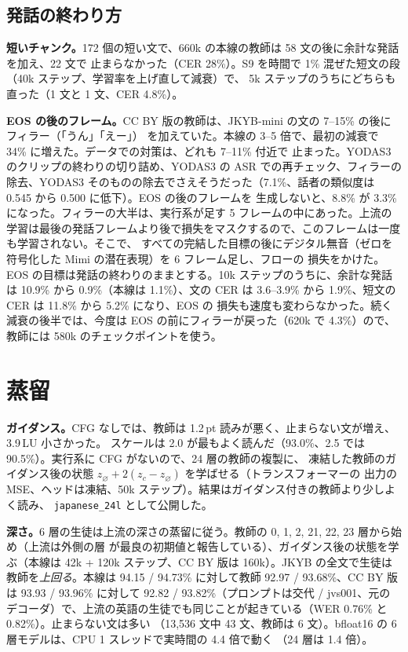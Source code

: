 \documentclass[10pt,a4paper,twocolumn]{article}
\newcommand{\pt}{\,pt}
\begin{document}
\subsection{発話の終わり方}\label{sec:end}
\textbf{短いチャンク。}172 個の短い文で、660k の本線の教師は 58 文の後に余計な発話を加え、22 文で
止まらなかった（CER 28\%）。S9 を時間で 1\% 混ぜた短文の段（40k ステップ、学習率を上げ直して減衰）で、
5k ステップのうちにどちらも直った（1 文と 1 文、CER 4.8\%）。

\textbf{EOS の後のフレーム。}CC BY 版の教師は、JKYB-mini の文の 7--15\% の後にフィラー（「うん」「えー」）
を加えていた。本線の 3--5 倍で、最初の減衰で 34\% に増えた。データでの対策は、どれも 7--11\% 付近で
止まった。YODAS3 のクリップの終わりの切り詰め、YODAS3 の ASR での再チェック、フィラーの除去、YODAS3
そのものの除去でさえそうだった（7.1\%、話者の類似度は 0.545 から 0.500 に低下）。EOS の後のフレームを
生成しないと、8.8\% が 3.3\% になった。フィラーの大半は、実行系が足す 5 フレームの中にあった。上流の
学習は最後の発話フレームより後で損失をマスクするので、このフレームは一度も学習されない。そこで、
すべての完結した目標の後にデジタル無音（ゼロを符号化した Mimi の潜在表現）を 6 フレーム足し、フローの
損失をかけた。EOS の目標は発話の終わりのままとする。10k ステップのうちに、余計な発話は 10.9\% から
0.9\%（本線は 1.1\%）、文の CER は 3.6--3.9\% から 1.9\%、短文の CER は 11.8\% から 5.2\% になり、EOS の
損失も速度も変わらなかった。続く減衰の後半では、今度は EOS の前にフィラーが戻った（620k で 4.3\%）ので、
教師には 580k のチェックポイントを使う。

\section{蒸留}\label{sec:distill}
\textbf{ガイダンス。}CFG なしでは、教師は 1.2\pt{} 読みが悪く、止まらない文が増え、3.9\,LU 小さかった。
スケールは 2.0 が最もよく読んだ（93.0\%、2.5 では 90.5\%）。実行系に CFG がないので、24 層の教師の複製に、
凍結した教師のガイダンス後の状態 $z_\varnothing+2(z_c-z_\varnothing)$ を学ばせる（トランスフォーマーの
出力の MSE、ヘッドは凍結、50k ステップ）。結果はガイダンス付きの教師より少しよく読み、
\texttt{japanese\_24l} として公開した。

\textbf{深さ。}6 層の生徒は上流の深さの蒸留に従う。教師の 0, 1, 2, 21, 22, 23 層から始め（上流は外側の層
が最良の初期値と報告している）、ガイダンス後の状態を学ぶ（本線は 42k + 120k ステップ、CC BY 版は
160k）。JKYB の全文で生徒は教師を\emph{上回る}。本線は 94.15 / 94.73\% に対して教師 92.97 /
93.68\%、CC BY 版は 93.93 / 93.96\% に対して 92.82 / 93.82\%（プロンプトは交代 / jvs001、元の
デコーダ）で、上流の英語の生徒でも同じことが起きている（WER 0.76\% と 0.82\%）。止まらない文は多い
（13,536 文中 43 文、教師は 6 文）。bfloat16 の 6 層モデルは、CPU 1 スレッドで実時間の 4.4 倍で動く
（24 層は 1.4 倍）。
\end{document}

